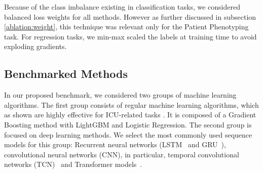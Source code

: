 \documentclass{article}
\begin{document}
Because of the class imbalance existing in classification tasks, we considered balanced loss weights for all methods. However as further discussed in subsection \ref{ablation:weight}, this technique was relevant only for the Patient Phenotyping task. For regression tasks, we min-max scaled the labels at training time to avoid exploding gradients.


\subsection{Benchmarked Methods}\label{ml_models}

In our proposed benchmark, we considered two groups of machine learning algorithms. The first group consists of regular machine learning algorithms, which as shown are highly effective for ICU-related tasks \citep{sadeghi2018early,harutyunyan2019multitask,hyland2020early}. It is composed of a Gradient Boosting method with LightGBM \citep{ke2017lightgbm} and Logistic Regression. The second group is focused on deep learning methods. We select the most commonly used sequence models for this group: Recurrent neural networks (LSTM~\citep{hochreiter1997long} and GRU~\citep{cho2014learning}), convolutional neural networks (CNN), in particular, temporal convolutional networks (TCN)~\cite{bai2018empirical} and Transformer models~\cite{vaswani2017attention}.
\end{document}
